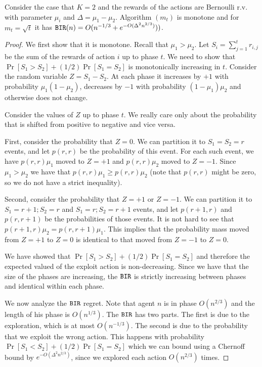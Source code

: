 \begin{lemma}
Consider the case that $K=2$ and the rewards of the actions are
Bernoulli r.v. with parameter $\mu_i$ and $\Delta=\mu_1-\mu_2$.
Algorithm \PhasedExplorExploit$(m_t)$ is monotone and for $m_t =
\sqrt{t}$ it has $\mathtt{BIR}(n)=O(n^{-1/3}+e^{-O(\Delta^2 n^{2/3})}))$. 
\end{lemma}

\begin{proof}
We first show that it is monotone. Recall that $\mu_1>\mu_2$. Let
$S_i=\sum_{j=1}^t r_{i,j}$ be the sum of the rewards of action $i$
up to phase $t$. We need to show that $\Pr[S_1>S_2]+ (1/2)
\Pr[S_1=S_2]$ is monotonically increasing in $t$. Consider the
random variable $Z=S_1-S_2$. At each phase it increases by $+1$ with
probability $\mu_1(1-\mu_2)$, decreases by $-1$ with probability
$(1-\mu_1)\mu_2$ and otherwise does not change.

Consider the values of $Z$ up to phase $t$. We really care only
about the probability that is shifted from positive to negative and
vice versa.

First, consider the probability that $Z=0$. We can partition it to
$S_1=S_2=r$ events, and let $p(r,r)$ be the probability of this
event. For each such event, we have $p(r,r)\mu_1$ moved to $Z=+1$
and $p(r,r)\mu_2$ moved to $Z=-1$. Since $\mu_1>\mu_2$ we have that
$p(r,r)\mu_1\geq p(r,r)\mu_2$ (note that $p(r,r)$ might be zero, so
we do not have a strict inequality).

Second, consider the probability that $Z=+1$ or $Z=-1$. We can
partition it to $S_1=r+1;S_2=r$ and $S_1=r;S_2=r+1$ events, and let
$p(r+1,r)$ and $p(r,r+1)$ be the probabilities of those events.
%
It is not hard to see that $p(r+1,r)\mu_2=p(r,r+1)\mu_1$.
%
This implies that the probability mass moved from $Z=+1$ to $Z=0$ is
identical to that moved from $Z=-1$ to $Z=0$.

We have showed that $\Pr[S_1>S_2]+ (1/2) \Pr[S_1=S_2]$ and therefore
the expected valued of the exploit action is non-decreasing. Since
we have that the size of the phases are increasing, the $\mathtt{BIR}$ is
strictly increasing between phases and identical within each phase.

We now analyze the $\mathtt{BIR}$ regret. Note that agent $n$ is in phase
$O(n^{2/3})$ and the length of his phase is $O(n^{1/3})$. The $\mathtt{BIR}$
has two parts. The first is due to the exploration, which is at most
$O(n^{-1/3})$. The second is due to the probability that we exploit
the wrong action. This happens with probability $\Pr[S_1<S_2]+ (1/2)
\Pr[S_1=S_2]$ which we can bound using a Chernoff bound by
$e^{-O(\Delta^2n^{2/3})}$, since we explored each action
$O(n^{2/3})$ times.
\end{proof}

